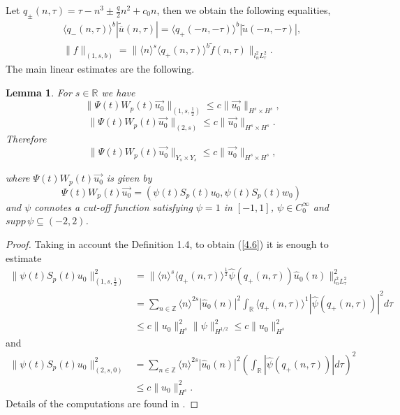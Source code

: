 \documentclass[reqno]{amsart}
\newtheorem{lemma}{Lemma}[section]
\numberwithin{equation}{section}
\begin{document}
Let $q_{\pm}(n,\tau)=\tau-n^{3}\pm\frac{q}{2}n^{2}+c_{0}n$, then
we obtain the following equalities,
\begin{align}\label{4.4}
\langle q_{-}(n,\tau)\rangle^{b}| \widetilde{\overline{u}}(n,\tau)| =\langle q_{+}(-n,-\tau)\rangle^{b}|
\widetilde{u}(-n,-\tau)| \text{,}
\\
\| f\| _{(1,s,b)}=\| \langle n\rangle^{s}\langle
q_{+}(n,\tau)\rangle^{b}\widetilde{f}(n,\tau)\| _{l_{n}^{2}L_{\tau
}^{2}}\text{.}
\end{align}
The main linear estimates are the following.

\begin{lemma}\label{2.1}
For $s\in\mathbb{R}$ we have
\[
\| \Psi(t)W_{p}(t)\overrightarrow{u_0}\| _{(1,s,\frac12)}\leq c\| \overrightarrow{u_0}\| _{H^{s}
\times H^{s}
}\text{,}
\]
\[
\| \Psi(t)W_{p}(t)\overrightarrow{u_0}\|
_{(2,s)}\leq
c\| \overrightarrow{u_0}\| _{H^{s}\times H^{s}}\text{.}\]
Therefore
\begin{equation}\label{4.6}
\| \Psi(t)W_{p}(t)\overrightarrow{u_0}\|
_{Y_{s}\times
Y_{s}}\leq c\| \overrightarrow{u_0}\| _{H^{s}\times H^{s}}\text{,}
\end{equation}

where $\Psi(t)W_{p}(t)\overrightarrow{u_0}$ is given by
\[
\Psi(t)W_{p}(t)\overrightarrow{u_0}=(\psi(t)S_{p}(t)u_{0},\psi
(t)S_{p}(t)w_{0})
\]
and $\psi$ connotes a cut-off function satisfying $\psi=1$ in $[-1,1]$,
$\psi\in C_{0}^{\infty}$ and
$\mathit{supp}\,\psi\subseteq(-2,2)$.
\end{lemma}
\begin{proof}
Taking in account the Definition 1.4, to obtain (\ref{4.6}) it is
enough to estimate
\begin{equation}\label{4.8}
\begin{split}
\| \psi(t)S_{p}(t)u_{0}\| _{(1,s,\frac12
)}^{2}  &  =\| \langle n\rangle^{s}\langle
q_{+}(n,\tau)\rangle
^{\frac{1}{2}}\widehat{\psi}(q_{+}(n,\tau))\widehat{u}_{0}(n)\|
_{l_{n}^{2}L_{\tau}^{2}}^{2}\\
&  =\sum\limits_{n\in\mathbb{Z}}\langle n\rangle^{2s}| \widehat
{u}_{0}(n)| ^{2}\int_{\mathbb{R}}\langle q_{+}(n,\tau)\rangle
^{1}| \widehat{\psi}(q_{+}(n,\tau))| ^{2}d\tau\\
&  \leq c\| u_{0}\| _{H^{s}}^{2}\|
\psi\| _{H^{1/2}}^{2}\leq c\| u_{0}\|
_{H^{s}}^{2}
\end{split}
\end{equation}
and
\begin{equation}\label{4.9}
\begin{split}
\| \psi(t)S_{p}(t)u_{0}\| _{(2,s,0)}^{2}  &
=\sum\limits_{n\in\mathbb{Z}}\langle n\rangle^{2s}| \widehat
{u}_{0}(n)| ^{2}\left( \int_{\mathbb{R}}|
\widehat{\psi}(q_{+}(n,\tau))
| d\tau\right)  ^{2}\\
& \leq c\| u_{0}\| _{H^s}^2.
\end{split}
\end{equation}
Details of the computations are found in \cite{27}.
\end{proof}
\end{document}
